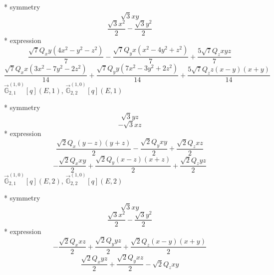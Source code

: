 \documentclass[fleqn,8pt]{jsarticle}
\begin{document}
\noindent\quad ** symmetry
\begin{dmath*}
\sqrt{3} x y
\end{dmath*}
\begin{dmath*}
\frac{\sqrt{3} x^{2}}{2} - \frac{\sqrt{3} y^{2}}{2}
\end{dmath*}
\noindent\quad ** expression
\begin{dmath*}
\frac{\sqrt{7} Q_{x} y \left(4 x^{2} - y^{2} - z^{2}\right)}{7} - \frac{\sqrt{7} Q_{y} x \left(x^{2} - 4 y^{2} + z^{2}\right)}{7} + \frac{5 \sqrt{7} Q_{z} x y z}{7}
\end{dmath*}
\begin{dmath*}
\frac{\sqrt{7} Q_{x} x \left(3 x^{2} - 7 y^{2} - 2 z^{2}\right)}{14} + \frac{\sqrt{7} Q_{y} y \left(7 x^{2} - 3 y^{2} + 2 z^{2}\right)}{14} + \frac{5 \sqrt{7} Q_{z} z \left(x - y\right) \left(x + y\right)}{14}
\end{dmath*}
\noindent\quad $\vec{\mathbb{G}}_{2,1}^{(1,0)}[q](E,1)$, $\vec{\mathbb{G}}_{2,2}^{(1,0)}[q](E,1)$

\noindent\quad ** symmetry
\begin{dmath*}
\sqrt{3} y z
\end{dmath*}
\begin{dmath*}
- \sqrt{3} x z
\end{dmath*}
\noindent\quad ** expression
\begin{dmath*}
\frac{\sqrt{2} Q_{x} \left(y - z\right) \left(y + z\right)}{2} - \frac{\sqrt{2} Q_{y} x y}{2} + \frac{\sqrt{2} Q_{z} x z}{2}
\end{dmath*}
\begin{dmath*}
- \frac{\sqrt{2} Q_{x} x y}{2} + \frac{\sqrt{2} Q_{y} \left(x - z\right) \left(x + z\right)}{2} + \frac{\sqrt{2} Q_{z} y z}{2}
\end{dmath*}
\noindent\quad $\vec{\mathbb{G}}_{2,1}^{(1,0)}[q](E,2)$, $\vec{\mathbb{G}}_{2,2}^{(1,0)}[q](E,2)$

\noindent\quad ** symmetry
\begin{dmath*}
\sqrt{3} x y
\end{dmath*}
\begin{dmath*}
\frac{\sqrt{3} x^{2}}{2} - \frac{\sqrt{3} y^{2}}{2}
\end{dmath*}
\noindent\quad ** expression
\begin{dmath*}
- \frac{\sqrt{2} Q_{x} x z}{2} + \frac{\sqrt{2} Q_{y} y z}{2} + \frac{\sqrt{2} Q_{z} \left(x - y\right) \left(x + y\right)}{2}
\end{dmath*}
\begin{dmath*}
\frac{\sqrt{2} Q_{x} y z}{2} + \frac{\sqrt{2} Q_{y} x z}{2} - \sqrt{2} Q_{z} x y
\end{dmath*}
\end{document}
